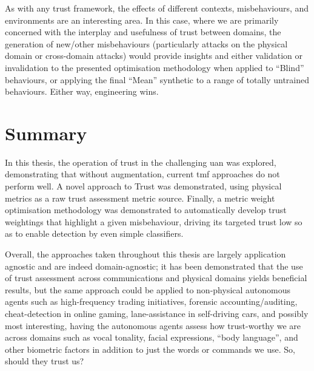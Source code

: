 As with any trust framework, the effects of different contexts, misbehaviours, and environments are an interesting area.
In this case, where we are primarily concerned with the interplay and usefulness of trust between domains, the generation of new/other misbehaviours (particularly attacks on the physical domain or cross-domain attacks) would provide insights and either validation or invalidation to the presented optimisation methodology when applied to ``Blind'' behaviours, or applying the final ``Mean'' synthetic to a range of totally untrained behaviours.
Either way, engineering wins.

\section{Summary}

In this thesis, the operation of trust in the challenging \gls{uan} was explored, demonstrating that without augmentation, current \gls{tmf} approaches do not perform well.
A novel approach to Trust was demonstrated, using physical metrics as a raw trust assessment metric source.
Finally, a metric weight optimisation methodology was demonstrated to automatically develop trust weightings that highlight a given misbehaviour, driving its targeted trust low so as to enable detection by even simple classifiers.

Overall, the approaches taken throughout this thesis are largely application agnostic and are indeed domain-agnostic; it has been demonstrated that the use of trust assessment across communications and physical domains yields beneficial results, but the same approach could be applied to non-physical autonomous agents such as high-frequency trading initiatives, forensic accounting/auditing,  cheat-detection in online gaming, lane-assistance in self-driving cars, and possibly most interesting, having the autonomous agents assess how trust-worthy we are across domains such as vocal tonality, facial expressions, ``body language'', and other biometric factors in addition to just the words or commands we use.
So, should they trust us?